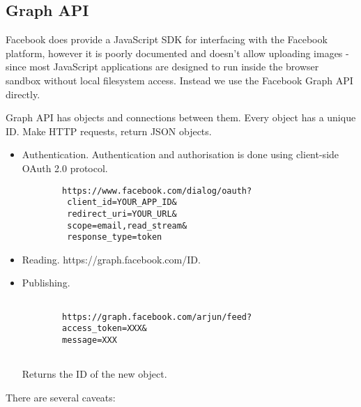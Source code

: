 \subsection{Graph API}

Facebook does provide a JavaScript SDK for interfacing with the Facebook platform, however it is poorly documented and doesn't allow uploading images - since most JavaScript applications are designed to run inside the browser sandbox without local filesystem access. Instead we use the Facebook Graph API directly.

Graph API has objects and connections between them. Every object has a unique ID. Make HTTP requests, return JSON objects.


\begin{itemize}

    \item Authentication. Authentication and authorisation is done using client-side OAuth 2.0 protocol.
    
    \begin{lstlisting}
        https://www.facebook.com/dialog/oauth?
         client_id=YOUR_APP_ID&
         redirect_uri=YOUR_URL&
         scope=email,read_stream&
         response_type=token
    \end{lstlisting}
    
    \item Reading. https://graph.facebook.com/ID.
    
    \item Publishing. \begin{lstlisting}
    
        https://graph.facebook.com/arjun/feed?
        access_token=XXX&
        message=XXX
    
    \end{lstlisting}
    
    Returns the ID of the new object.

\end{itemize}

There are several caveats:

